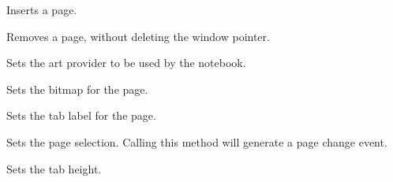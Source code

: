 Inserts a page.

\label{wxauinotebookremovepage}


Removes a page, without deleting the window pointer.

\label{wxauinotebooksetartprovider}


Sets the art provider to be used by the notebook.

\label{wxauinotebooksetpagebitmap}


Sets the bitmap for the page.

\label{wxauinotebooksetpagetext}


Sets the tab label for the page.

\label{wxauinotebooksetselection}


Sets the page selection.  Calling this method will generate a page change event.

\label{wxauinotebooksettabctrlheight}


Sets the tab height.

